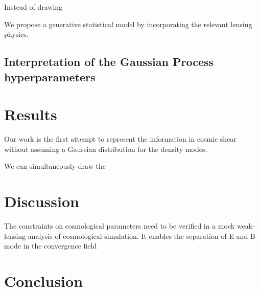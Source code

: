 

Instead of drawing 

We propose a generative statistical model by incorporating the relevant lensing physics.  

\subsection{Interpretation of the Gaussian Process hyperparameters}
 

\section{Results}
Our work is the first attempt to represent the information in cosmic shear
without assuming a Gaussian distribution for the density modes.  

We can simultaneously draw the 


\section{Discussion}
The constraints on cosmological parameters need to be verified in a mock
weak-lensing analysis of cosmological simulation. 
It enables the separation of E and B mode in the convergence field  


\section{Conclusion}

